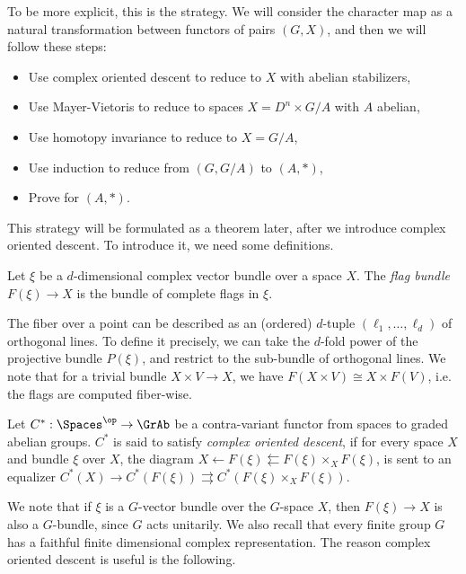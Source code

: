 To be more explicit, this is the strategy.
We will consider the character map as a natural transformation between functors of pairs $\left(G, X\right)$, and then we will follow these steps:
\begin{itemize}
	\item Use complex oriented descent to reduce to $X$ with abelian stabilizers,
	\item Use Mayer-Vietoris to reduce to spaces $X = D^n \times G/A$ with $A$ abelian,
	\item Use homotopy invariance to reduce to $X = G/A$,
	\item Use induction to reduce from $\left(G, G/A\right)$ to $\left(A, *\right)$,
	\item Prove for $\left(A, *\right)$.
\end{itemize}

This strategy will be formulated as a theorem later, after we introduce complex oriented descent.
To introduce it, we need some definitions.

\begin{definition}
	Let $\xi$ be a $d$-dimensional complex vector bundle over a space $X$.
	The \emph{flag bundle} $F\left(\xi\right) \to X$ is the bundle of complete flags in $\xi$.
\end{definition}

The fiber over a point can be described as an (ordered) $d$-tuple $\left(\ell_1, \dotsc, \ell_d\right)$ of orthogonal lines.
To define it precisely, we can take the $d$-fold power of the projective bundle $P\left(\xi\right)$, and restrict to the sub-bundle of orthogonal lines.
We note that for a trivial bundle $X \times V \to X$, we have $F\left(X \times V\right) \cong X \times F\left(V\right)$, i.e. the flags are computed fiber-wise.

\begin{definition}
	Let $C^*: \Spaces^\op \to \GrAb$ be a contra-variant functor from spaces to graded abelian groups.
	$C^*$ is said to satisfy \emph{complex oriented descent},
	if for every space $X$ and bundle $\xi$ over $X$, the diagram
	$X \leftarrow F\left(\xi\right) \leftleftarrows F\left(\xi\right) \times_X F\left(\xi\right)$,
	is sent to an equalizer
	$C^*\left(X\right) \to C^*\left(F\left(\xi\right)\right) \rightrightarrows C^*\left(F\left(\xi\right) \times_X F\left(\xi\right)\right)$.
\end{definition}

We note that if $\xi$ is a $G$-vector bundle over the $G$-space $X$, then $F\left(\xi\right) \to X$ is also a $G$-bundle, since $G$ acts unitarily.
We also recall that every finite group $G$ has a faithful finite dimensional complex representation.
The reason complex oriented descent is useful is the following.

